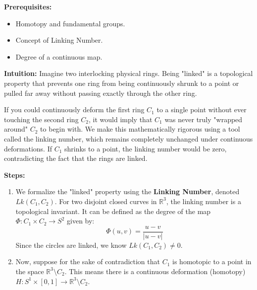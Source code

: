 \begin{solution}
\textbf{Prerequisites:}
\begin{itemize}
    \item Homotopy and fundamental groups.
    \item Concept of Linking Number.
    \item Degree of a continuous map.
\end{itemize}

\textbf{Intuition:}
Imagine two interlocking physical rings. Being "linked" is a topological property that prevents one ring from being continuously shrunk to a point or pulled far away without passing exactly through the other ring. 

If you could continuously deform the first ring $C_1$ to a single point without ever touching the second ring $C_2$, it would imply that $C_1$ was never truly "wrapped around" $C_2$ to begin with. We make this mathematically rigorous using a tool called the linking number, which remains completely unchanged under continuous deformations. If $C_1$ shrinks to a point, the linking number would be zero, contradicting the fact that the rings are linked.

\textbf{Steps:}
\begin{enumerate}
    \item We formalize the "linked" property using the \textbf{Linking Number}, denoted $Lk(C_1, C_2)$. For two disjoint closed curves in $\mathbb{R}^3$, the linking number is a topological invariant. It can be defined as the degree of the map $\Phi: C_1 \times C_2 \to S^2$ given by:
    \[ \Phi(u, v) = \frac{u - v}{|u - v|} \! \]
    Since the circles are linked, we know $Lk(C_1, C_2) \neq 0$.

    \item Now, suppose for the sake of contradiction that $C_1$ is homotopic to a point in the space $\mathbb{R}^3 \setminus C_2$. This means there is a continuous deformation (homotopy) $H: S^1 \times [0,1] \to \mathbb{R}^3 \setminus C_2$.


\end{enumerate}
\end{solution}
